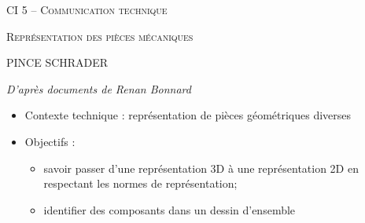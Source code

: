 \documentclass[11pt,oneside]{article}
\begin{document}
\pagestyle{fancy}
\renewcommand{\headrulewidth}{0pt}

\fancyhead{}

\fancyhead[C]{\rule{11cm}{.5pt}}


\renewcommand{\footrulewidth}{0.2pt}

\fancyfoot[C]{\footnotesize{\bfseries \thepage}}




\begin{center}
 \huge\textsc{CI 5 -- Communication technique}
\end{center}

\begin{center}
 \LARGE\textsc{Représentation des pièces mécaniques}
\end{center}


\begin{center}
 \LARGE\textsc{PINCE SCHRADER}
\end{center}

\vspace{.5cm}

\textit{D'après documents de Renan Bonnard}

\begin{contexte}
\begin{itemize}
\item Contexte technique : représentation de pièces géométriques diverses
\item Objectifs : 
\begin{itemize}
\item savoir passer d'une représentation 3D à une représentation 2D en respectant les normes de représentation;
\item identifier des composants dans un dessin d'ensemble
\end{itemize}
\end{itemize}
\end{contexte}
\end{document}
